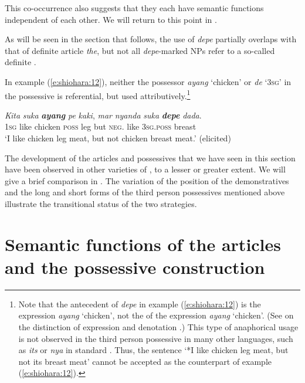 \documentclass[output=paper
,modfonts
,nonflat]{langsci/langscibook}
\begin{document}
\noindent
This co-occurrence also suggests that they each have semantic functions independent of each other. We will return to this point in .

As will be seen in the section that follows, the use of \textit{depe} partially overlaps with that of  definite article \textit{the}, but not all \textit{depe}-marked NPs refer to a so-called definite .

In example (\ref{e:shiohara:12}), neither the possessor \textit{ayang} ‘chicken’ or \textit{de} ‘\textsc{3sg}’ in the possessive is referential, but used attributively.\footnote{Note that the antecedent of \textit{depe} in example (\ref{e:shiohara:12}) is the expression \textit{ayang} ‘chicken’, not the  of the expression \textit{ayang} ‘chicken’. (See \citealt[23]{Krifka2012} on the distinction of expression  and denotation .) This type of anaphorical usage is not observed in the third person possessive  in many other languages, such as  \textit{its} or \textit{nya} in standard . Thus, the sentence ‘*I like chicken leg meat, but not its breast meat’ cannot be accepted as the  counterpart of example (\ref{e:shiohara:12}).}

\begin{exe}
	\ex\label{e:shiohara:12}
	\gll \textit{Kita} \textit{suka} \textbf{\textit{ayang}} \textit{pe} \textit{kaki}, \textit{mar} \textit{nyanda} \textit{suka} \textbf{\textit{depe}} \textit{dada}.\\
	\textsc{1sg} like  chicken  \textsc{poss}  leg  but \textsc{neg}. like \textsc{3sg.poss} breast\\
	\glt ‘I like chicken leg meat, but not chicken breast meat.’ \hfill{(elicited)}
\end{exe}

\noindent
The development of the articles and possessives that we have seen in this section have been observed in other varieties of , to a lesser or greater extent. We will give a brief comparison in . The variation of the position of the demonstratives and the long and short forms of the third person possessives mentioned above illustrate the transitional status of the two strategies.

\section{\label{s:shiohara:3}Semantic functions of the articles and the possessive construction}
\end{document}
